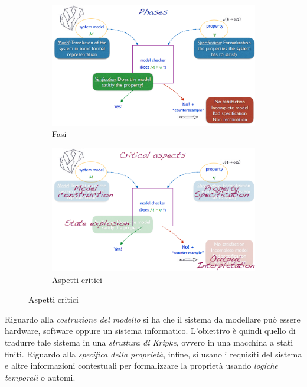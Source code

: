 \documentclass[a4paper,oneside,titlepage]{book}
\begin{document}
\begin{figure}[htp]
	\begin{subfigure}{0.49\textwidth}
	    \centering
		\includegraphics[width=\textwidth, height=\textheight, keepaspectratio]{mc2.png}
		\caption{Fasi}
	\end{subfigure}
	\hfill
	\begin{subfigure}{0.49\textwidth}
	    \centering
		\includegraphics[width=\textwidth, height=\textheight, keepaspectratio]{mc3.png}
		\caption{Aspetti critici}
	\end{subfigure}
\end{figure}
Riguardo alla \textit{costruzione del modello} si ha che il sistema da modellare può essere hardware, software oppure un sistema informatico. L'obiettivo è quindi quello di tradurre tale sistema in una \textit{struttura di Kripke}, ovvero in una macchina a stati finiti. Riguardo alla \textit{specifica della proprietà}, infine, si usano i requisiti del sistema e altre informazioni contestuali per formalizzare la proprietà usando \textit{logiche temporali} o automi.
\end{document}
